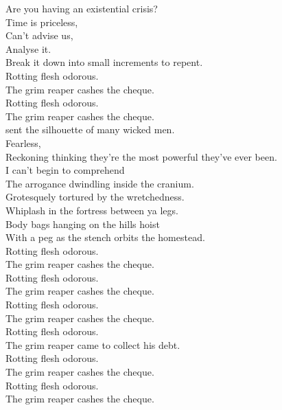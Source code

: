 Are you having an existential crisis? \\
Time is priceless, \\
Can't advise us, \\
Analyse it. \\
Break it down into small increments to repent. \\

Rotting flesh odorous. \\
The grim reaper cashes the cheque. \\
Rotting flesh odorous. \\
The grim reaper cashes the cheque. \\

 sent the silhouette of many wicked men. \\
Fearless, \\
Reckoning thinking they're the most powerful they've ever been. \\
I can't begin to comprehend \\
The arrogance dwindling inside the cranium. \\

Grotesquely tortured by the wretchedness. \\
Whiplash in the fortress between ya legs. \\
Body bags hanging on the hills hoist \\
With a peg as the stench orbits the homestead. \\

Rotting flesh odorous. \\
The grim reaper cashes the cheque. \\
Rotting flesh odorous. \\
The grim reaper cashes the cheque. \\
Rotting flesh odorous. \\
The grim reaper cashes the cheque. \\
Rotting flesh odorous. \\
The grim reaper came to collect his debt. \\

Rotting flesh odorous. \\
The grim reaper cashes the cheque. \\
Rotting flesh odorous. \\
The grim reaper cashes the cheque. \\



